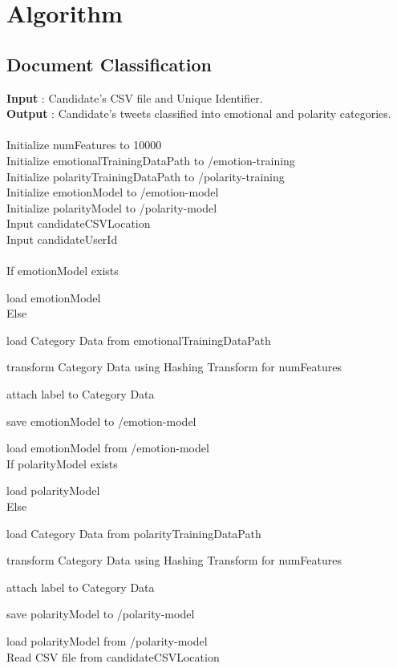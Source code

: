 \documentclass[oneside,a4paper,12pt]{pictreport}
\begin{document}
\section{Algorithm}
\subsection{Document Classification}

\textbf{Input} : Candidate's CSV file and Unique Identifier. \\
\textbf{Output} : Candidate's tweets classified into emotional and polarity categories. \\\\
Initialize numFeatures to 10000 \\
Initialize emotionalTrainingDataPath to /emotion-training \\  
Initialize polarityTrainingDataPath to /polarity-training \\
Initialize emotionModel to /emotion-model \\
Initialize polarityModel to /polarity-model \\
Input candidateCSVLocation \\
Input candidateUserId \\\\
If  emotionModel exists
    \par load emotionModel\\
Else
    \par load Category Data from emotionalTrainingDataPath
	\par transform Category Data using Hashing Transform for numFeatures
	\par attach label to Category Data
	\par save emotionModel to /emotion-model
	\par load emotionModel from /emotion-model\\
If  polarityModel exists
	\par load polarityModel \\
Else
	\par load Category Data from polarityTrainingDataPath
	\par transform Category Data using Hashing Transform for numFeatures
	\par attach label to Category Data
	\par save polarityModel to /polarity-model
	\par load polarityModel from /polarity-model\\
Read CSV file from candidateCSVLocation\\
\end{document}
